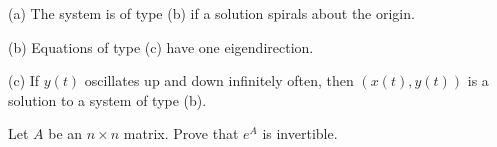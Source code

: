 \documentclass{ximera}
\begin{document}
\begin{exercise}
\begin{solution}
(a) The system is of type (b) if a solution spirals about the origin.

(b) Equations of type (c) have one eigendirection.

(c) If $y(t)$ oscillates up and down infinitely often, then
$(x(t),y(t))$ is a solution to a system of type (b).


\begin{figure}[htb]
                       \centerline{%
                       }
\end{figure}



\end{solution}
\end{exercise}

\AEXER

\begin{exercise} \label{c6.4.a1}
Let $A$ be an $n\times n$ matrix.  Prove that $e^A$ is invertible.
\end{exercise}
\end{document}
